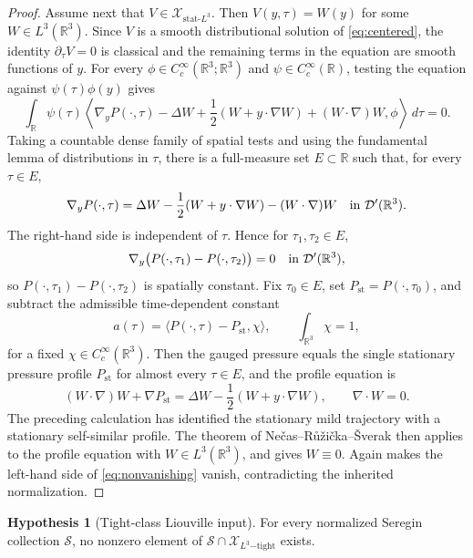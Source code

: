 \documentclass[11pt]{amsart}
\theoremstyle{plain}
\theoremstyle{definition}
\newtheorem{hypothesis}[theorem]{Hypothesis}
\theoremstyle{remark}
\numberwithin{equation}{section}
\begin{document}
\begin{proof}
Assume next that \(V\in\mathcal X_{\mathrm{stat}\text{-}L^3}\).  Then
\(V(y,\tau)=W(y)\) for some \(W\in L^3(\mathbb R^3)\).  Since \(V\) is a
smooth distributional solution of \eqref{eq:centered}, the identity
\(\partial_\tau V=0\) is classical and the remaining terms in the equation are
smooth functions of \(y\).  For every
\(\phi\in C_c^\infty(\mathbb R^3;\mathbb R^3)\) and
\(\psi\in C_c^\infty(\mathbb R)\), testing the equation against
\(\psi(\tau)\phi(y)\) gives
\[
   \int_{\mathbb R}\psi(\tau)
   \left\langle
      \nabla_yP(\cdot,\tau)
      -\Delta W+\frac12(W+y\cdot\nabla W)+(W\cdot\nabla)W,
      \phi
   \right\rangle\,d\tau=0 .
\]
Taking a countable dense family of spatial tests and using the fundamental
lemma of distributions in \(\tau\), there is a full-measure set
\(E\subset\mathbb R\) such that, for every \(\tau\in E\),
\[
   \nabla_yP(\cdot,\tau)
   =
   \Delta W-\frac12(W+y\cdot\nabla W)-(W\cdot\nabla)W
   \quad\hbox{in }\mathcal D'(\mathbb R^3).
\]
The right-hand side is independent of \(\tau\).  Hence for
\(\tau_1,\tau_2\in E\),
\[
   \nabla_y\bigl(P(\cdot,\tau_1)-P(\cdot,\tau_2)\bigr)=0
   \quad\hbox{in }\mathcal D'(\mathbb R^3),
\]
so \(P(\cdot,\tau_1)-P(\cdot,\tau_2)\) is spatially constant.  Fix
\(\tau_0\in E\), set \(P_{\mathrm{st}}=P(\cdot,\tau_0)\), and subtract the
admissible time-dependent constant
\[
   a(\tau)=\langle P(\cdot,\tau)-P_{\mathrm{st}},\chi\rangle ,
   \qquad \int_{\mathbb R^3}\chi=1,
\]
for a fixed \(\chi\in C_c^\infty(\mathbb R^3)\).  Then the gauged pressure
equals the single stationary pressure profile \(P_{\mathrm{st}}\) for
almost every \(\tau\in E\), and the profile equation is
\[
   (W\cdot\nabla)W+\nabla P_{\mathrm{st}}
   =
   \Delta W-\frac12(W+y\cdot\nabla W),
   \qquad \nabla\cdot W=0 .
\]
The preceding calculation has identified the stationary mild trajectory with
a stationary self-similar profile.  The theorem of
Ne\v{c}as--R\r{u}\v{z}i\v{c}ka--\v{S}verak \cite{NRS1996} then applies to
the profile equation with \(W\in L^3(\mathbb R^3)\), and gives
\(W\equiv0\).  Again
 makes the left-hand side of
\eqref{eq:nonvanishing} vanish, contradicting the inherited normalization.
\end{proof}

\begin{hypothesis}[Tight-class Liouville input]\label{hyp:tight-liouville}
For every normalized Seregin collection \(\mathcal S\), no nonzero element of
\(\mathcal S\cap\mathcal X_{L^3\mathrm{-tight}}\) exists.
\end{hypothesis}
\end{document}
